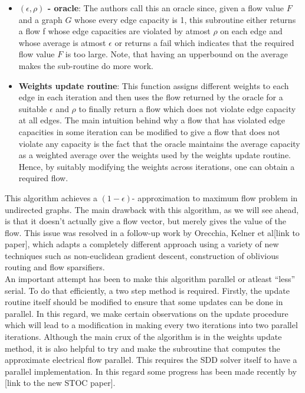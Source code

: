 \documentclass[BTech]{iitmdiss}
\begin{document}
	 \begin{itemize}
	  \item 
	    \textbf{$(\epsilon, \rho)$ - oracle}: The authors call this an oracle since, given a flow value $F$ and a graph $G$ whose every
	    edge capacity is 1, this subroutine either returns a flow f whose edge capacities are violated by atmost $\rho$ on each edge 
	    and whose average is atmost $\epsilon$ or returns a fail which indicates that the required flow value $F$ is too large. Note, that 
	    having an upperbound on the average makes the sub-routine do more work.
	  \item
	    \textbf{Weights update routine}: This function assigns different weights to each edge in each iteration and then uses the flow returned 
	    by the oracle for a suitable $\epsilon$ and $\rho$ to finally return a flow which does not violate edge capacity at all edges. The main 
	    intuition behind why a flow that has violated edge capacities in some iteration can be modified to give a flow that does not violate 
	    any capacity is the fact that the oracle maintains the average capacity as a weighted average over the weights used by the weights
	    update routine. Hence, by suitably modifying the weights across iterations, one can obtain a required flow.
	 \end{itemize}

	  This algorithm achieves a $(1- \epsilon)$- approximation to maximum flow problem in undirected graphs. The main drawback with this algorithm,
	  as we will see ahead, is that it doesn't actually give a flow vector, but merely gives the value of the flow. This issue was resolved 
	  in a follow-up work by Orecchia, Kelner et al[link to paper], which adapts a completely different approach using a variety of new techniques
	  such as non-euclidean gradient descent, construction of oblivious routing and flow sparsifiers. \\
	  
	  An important attempt has been to make this algorithm parallel or atleast ``less'' serial. To do that efficiently, a two step method is 
	  required. Firstly, the update routine itself should be modified to ensure that some updates can be done in parallel. In this regard, we make
	  certain observations on the update procedure which will lead to a modification in making every two iterations into two parallel iterations.
	  Although the main crux of the algorithm is in the weights update method, it is also helpful to try and make the subroutine that computes the
	  approximate electrical flow parallel. This requires the SDD solver itself to have a parallel implementation. In this regard some progress has
	  been made recently by [link to the new STOC paper]. \\
	
\end{document}
